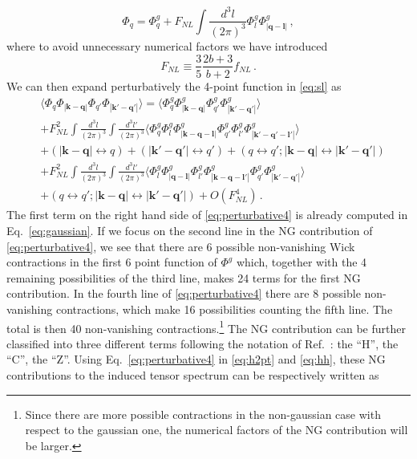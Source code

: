 \documentclass[a4paper,11pt]{article}
\numberwithin{equation}{section}
\begin{document}
\begin{equation}\label{eq:FNLPHIExpansion}
\Phi_q=\Phi_q^g+F_{NL}\int \frac{d^3l}{(2\pi)^3}\Phi_l^g\Phi_{|\mathbf{q}-\mathbf{l}|}^g\,,
\end{equation}
where to avoid unnecessary numerical factors we have introduced
\begin{equation}
F_{NL}\equiv\frac{3}{5}\frac{2b+3}{b+2}f_{NL}\,.
\end{equation}
We can then expand perturbatively the 4-point function in \eqref{eq:sl} as
\begin{align}\label{eq:perturbative4}
&\langle\Phi_q\Phi_{|\mathbf{k}-\mathbf{q}|}\Phi_{q'}\Phi_{|\mathbf{k}'-\mathbf{q}'|}\rangle=\langle\Phi^g_q\Phi^g_{|\mathbf{k}-\mathbf{q}|}\Phi^g_{q'}\Phi^g_{|\mathbf{k}'-\mathbf{q}'|}\rangle\nonumber\\&+ F_{NL}^2\int\frac{d^3l}{(2\pi)^3}\int\frac{d^3l'}{(2\pi)^3}\langle\Phi^g_{q}\Phi^g_l\Phi^g_{|\mathbf{k}-\mathbf{q}-\mathbf{l}|}\Phi^g_{q'}\Phi^g_{l'}\Phi^g_{|\mathbf{k}'-\mathbf{q}'-\mathbf{l}'|}\rangle\nonumber\\&+(|\mathbf{k}-\mathbf{q}|\leftrightarrow q)+(|\mathbf{k'}-\mathbf{q'}|\leftrightarrow q')+(q\leftrightarrow q';|\mathbf{k}-\mathbf{q}|\leftrightarrow|\mathbf{k'}-\mathbf{q'}|)\nonumber\\&+ F_{NL}^2\int\frac{d^3l}{(2\pi)^3}\int\frac{d^3l'}{(2\pi)^3}\langle\Phi^g_{l}\Phi^g_{|\mathbf{q}-\mathbf{l}|}\Phi^g_{l'}\Phi^g_{|\mathbf{k}-\mathbf{q}-\mathbf{l}'|}\Phi^g_{q'}\Phi^g_{|\mathbf{k}'-\mathbf{q}'|}\rangle\nonumber\\&+(q\leftrightarrow q';|\mathbf{k}-\mathbf{q}|\leftrightarrow|\mathbf{k'}-\mathbf{q'}|)+O(F_{NL}^4)\,.
\end{align}
The first term on the right hand side of \eqref{eq:perturbative4} is already computed in Eq.~\eqref{eq:gaussian}. If we focus on the second line in the NG contribution of \eqref{eq:perturbative4}, we see that there are 6 possible non-vanishing Wick contractions in the first 6 point function of $\Phi^g$ which, together with the 4 remaining possibilities of the third line, makes 24 terms for the first NG contribution. In the fourth line of \eqref{eq:perturbative4} there are 8 possible non-vanishing contractions, which make 16 possibilities counting the fifth line. The total is then 40 non-vanishing contractions.\footnote{Since there are more possible contractions in the non-gaussian case with respect to the gaussian one, the numerical factors of the NG contribution will be larger.} The NG contribution can be further classified into three different terms following the notation of Ref.~\cite{Adshead:2021hnm}: the ``H'', the ``C'', the ``Z''. Using Eq.~\eqref{eq:perturbative4} in \eqref{eq:h2pt} and \eqref{eq:hh}, these NG contributions to the induced tensor spectrum can be respectively written as
\end{document}
